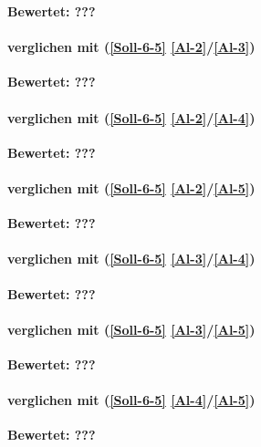 \textbf{Bewertet: ???}


\paragraph*{  verglichen mit  (\ref{Soll-6-5} \ref{Al-2}/\ref{Al-3})}

\textbf{Bewertet: ???}

\paragraph*{  verglichen mit  (\ref{Soll-6-5} \ref{Al-2}/\ref{Al-4})}

\textbf{Bewertet: ???}

\paragraph*{  verglichen mit  (\ref{Soll-6-5} \ref{Al-2}/\ref{Al-5})}

\textbf{Bewertet: ???}

\paragraph*{  verglichen mit  (\ref{Soll-6-5} \ref{Al-3}/\ref{Al-4})}

\textbf{Bewertet: ???}

\paragraph*{  verglichen mit  (\ref{Soll-6-5} \ref{Al-3}/\ref{Al-5})}

\textbf{Bewertet: ???}


\paragraph*{  verglichen mit  (\ref{Soll-6-5} \ref{Al-4}/\ref{Al-5})}

\textbf{Bewertet: ???}
